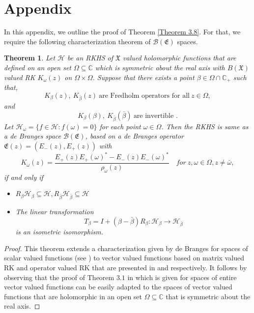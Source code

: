 \documentclass [12pt,reqno]{amsart}
\numberwithin{equation}{subsection}
\newtheorem{thm}{Theorem}[section]
\numberwithin{equation}{section}
\begin{document}
\section{Appendix}
In this appendix, we outline the proof of Theorem \ref{Theorem 3.8}. For that, we require the following characterization theorem of $\mathcal{B}(\mathfrak{E})$ spaces.
\begin{thm}\label{Theorem 4.1}
Let $\mathcal{H}$ be an RKHS of $\mathfrak{X}$ valued holomorphic functions that are defined on an open set $\Omega \subseteq \mathbb{C}$ which is symmetric about the real axis with $B(\mathfrak{X})$ valued RK $K_{\omega}(z)$ on $\Omega \times \Omega$. Suppose that there exists a point $\beta \in \Omega \cap \mathbb{C}_+$ such that,
 $$K_{\beta}(z), ~ K_{\bar{\beta}}(z) ~\mbox{are Fredholm operators for all}~ z \in \Omega,$$
 and $$K_{\beta}(\beta), ~ K_{\bar{\beta}}(\bar{\beta}) ~\mbox{are invertible }.$$
 Let $\mathcal{H}_{\omega}= \{ f \in \mathcal{H}: f(\omega)=0 \}$ for each point $\omega \in \Omega$. Then the RKHS is same as a de Branges space $\mathcal{B}(\mathfrak{E})$, based on a de Branges operator $\mathfrak{E}(z)= (E_-(z), E_+(z))$ with $$K_{\omega}(z)= \frac{E_+(z)E_+(\omega)^*-E_-(z)E_-(\omega)^*}{\rho_\omega(z)}  \quad{for}~ z, \omega \in \Omega, z \neq \bar{\omega},$$
 if and only if 
\begin{itemize}
\item[(1)] $R_{\beta}\mathcal{H}_{\beta} \subseteq \mathcal{H}, R_{\bar{\beta}}\mathcal{H}_{\bar{\beta}} \subseteq \mathcal{H}$
\item[(2)] The linear transformation $$T_{\beta}= I+(\beta- \bar{\beta})R_{\beta}: \mathcal{H}_{\beta} \rightarrow \mathcal{H}_{\bar{\beta}}$$ is an isometric isomorphism.
\end{itemize}
\end{thm}
\begin{proof}
This theorem extends a characterization given by de Branges for spaces of scalar valued functions (see \cite{brange}) to vector valued functions based on matrix valued RK and operator valued RK that are presented in \cite{sarkar} and \cite{mahapatra2} respectively. It follows by observing that the proof of Theorem $3.1$ in \cite{mahapatra2} which is given for spaces of entire vector valued functions can be easily adapted to the spaces of vector valued functions that are holomorphic in an open set $\Omega \subseteq \mathbb{C}$ that is symmetric about the real axis.
\end{proof}
\end{document}
